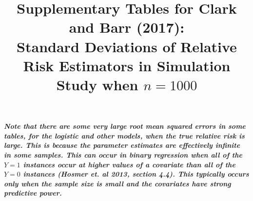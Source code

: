 \documentclass[12pt,a4paper]{article}
\date{}
\begin{document}
\title{Supplementary Tables for Clark and Barr (2017):  \\  
Standard Deviations of Relative Risk Estimators in Simulation Study when $n=1000$ }


\maketitle



{\bf \it Note that there are some very large root mean squared errors in some tables, for the logistic and other models, when the true relative risk is large. This is because the parameter estimates are effectively infinite in some samples. This can occur in binary regression when all of the $Y=1$ instances occur at higher values of a covariate than all of the $Y=0$ instances (Hosmer et. al 2013, section 4.4). This typically occurs only when the sample size is small and the covariates have strong predictive power.}
\end{document}
